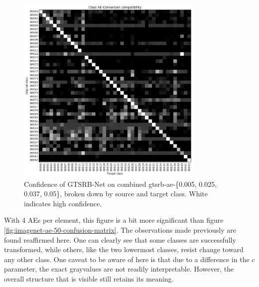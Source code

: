 \documentclass[11pt, a4paper]{article}
\begin{document}
\begin{figure}[h!tb]
	\centering
	\includegraphics[width=0.8\textwidth]{images/confusion-matrices/gtsrb-ae-multiple-0005-0025-0037-005.png}
	\caption[Confidence of GTSRB-Net on GTSRB, by source and target class]{Confidence of GTSRB-Net on combined gtsrb-ae-\{0.005, 0.025, 0.037, 0.05\}, broken down by source and target class. White indicates high confidence.}
	\label{fig:gtsrb-ae-multiple-confusion-matrix}
\end{figure}

With 4 AEs per element, this figure is a bit more significant than figure \ref{fig:imagenet-ae-50-confusion-matrix}. The observations made previously are found reaffirmed here. One can clearly see that some classes are successfully transformed, while others, like the two lowermost classes, resist change toward any other class. One caveat to be aware of here is that due to a difference in the $c$ parameter, the exact grayvalues are not readily interpretable. However, the overall structure that is visible still retains its meaning.

\end{document}
